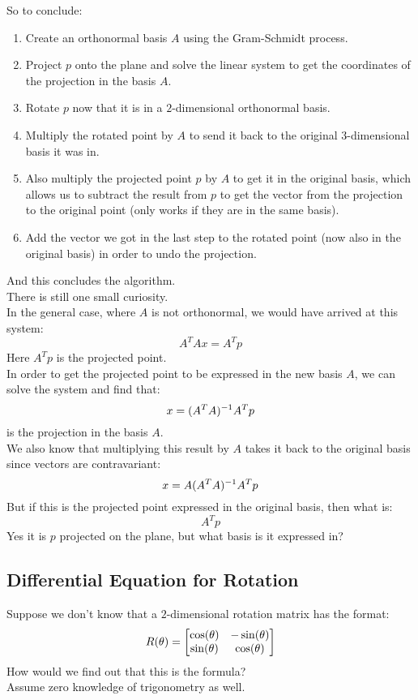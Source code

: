 \documentclass[12pt]{article}
\begin{document}
So to conclude:
\begin{enumerate}
    \item 
    Create an orthonormal basis $A$
    using the Gram-Schmidt process.
    \item 
    Project $p$ onto the plane
    and solve the linear system to get
    the coordinates of the projection
    in the basis $A$.
    \item 
    Rotate $p$ now that it is in a $2$-dimensional
    orthonormal basis.
    \item
    Multiply the rotated point by $A$
    to send it back to the original $3$-dimensional
    basis it was in.
    \item 
    Also multiply the projected point $p$
    by $A$ to get it in the original basis,
    which allows us to subtract the result
    from $p$ to get the vector from
    the projection to the original point
    (only works if they are in the same basis).
    \item 
    Add the vector we got in the last step
    to the rotated point (now also in the original
    basis) in order to undo the projection.
\end{enumerate}
And this concludes the algorithm. \\

There is still one small curiosity. \\
In the general case, where $A$
is not orthonormal,
we would have arrived at this system:
\[ A^TAx = A^Tp \]
Here $A^Tp$ is the projected point. \\
In order to get the projected point
to be expressed in the new basis $A$,
we can solve the system and find that:
\[ x = (A^TA)^{-1} A^Tp  \]
is the projection in the basis $A$. \\
We also know that multiplying
this result by $A$
takes it back to the original basis
since vectors are contravariant:
\[ x = A(A^TA)^{-1} A^Tp \]
But if this is the projected point
expressed in the original basis,
then what is:
\[  A^Tp \]
Yes it is $p$ projected on the plane,
but what basis is it expressed in? \\

\newpage

\subsection*{Differential Equation for Rotation}

Suppose we don't know that a $2$-dimensional rotation
matrix has the format:
\[ R(\theta) = 
\begin{bmatrix} {\cos(\theta)} & {-\sin(\theta)} \\
{\sin(\theta)} & {\cos(\theta)} \end{bmatrix} \]
How would we find out that this is
the formula? \\
Assume zero knowledge of trigonometry as well. \\
\end{document}
